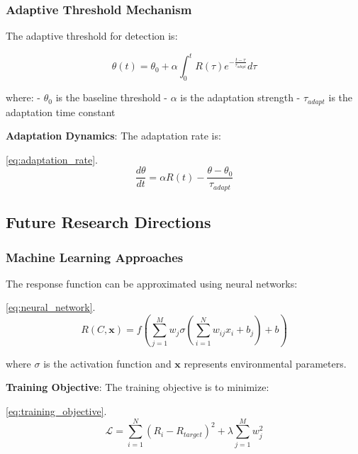 \documentclass[
  13pt,
  a4paperpaper,
  12pt]{article}
\begin{document}
\subsubsection{Adaptive Threshold
Mechanism}\label{adaptive-threshold-mechanism}

The adaptive threshold for detection is:

\begin{equation}
\theta(t) = \theta_0 + \alpha \int_0^t R(\tau) e^{-\frac{t-\tau}{\tau_{adapt}}} d\tau \label{eq:adaptive_threshold}
\end{equation}

where: - \(\theta_0\) is the baseline threshold - \(\alpha\) is the
adaptation strength - \(\tau_{adapt}\) is the adaptation time constant

\textbf{Adaptation Dynamics}: The adaptation rate is:

\eqref{eq:adaptation_rate}. \begin{equation}
\frac{d\theta}{dt} = \alpha R(t) - \frac{\theta - \theta_0}{\tau_{adapt}} \label{eq:adaptation_rate}
\end{equation}

\subsection{Future Research
Directions}\label{future-research-directions}

\subsubsection{Machine Learning
Approaches}\label{machine-learning-approaches}

The response function can be approximated using neural networks:

\eqref{eq:neural_network}. \begin{equation}
R(C, \mathbf{x}) = f\left(\sum_{j=1}^{M} w_j \sigma\left(\sum_{i=1}^{N} w_{ij} x_i + b_j\right) + b\right) \label{eq:neural_network}
\end{equation}

where \(\sigma\) is the activation function and \(\mathbf{x}\)
represents environmental parameters.

\textbf{Training Objective}: The training objective is to minimize:

\eqref{eq:training_objective}. \begin{equation}
\mathcal{L} = \sum_{i=1}^{N} \left(R_i - R_{target}\right)^2 + \lambda \sum_{j=1}^{M} w_j^2 \label{eq:training_objective}
\end{equation}
\end{document}
